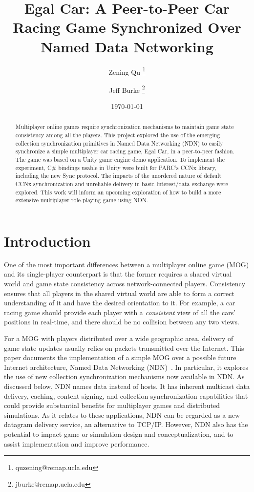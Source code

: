\documentclass{article}
\begin{document}
\title{Egal Car: A Peer-to-Peer Car Racing Game Synchronized Over Named Data Networking}
\author{Zening Qu \thanks{quzening@remap.ucla.edu}}
\author{Jeff Burke \thanks{jburke@remap.ucla.edu}}

\date{\today}
\maketitle

\begin{abstract}
Multiplayer online games require synchronization mechanisms to maintain game state consistency among all the players. This project explored the use of the emerging collection synchronization primitives in Named Data Networking (NDN) to easily synchronize a simple multiplayer car racing game, Egal Car, in a peer-to-peer fashion.  The game was based on a Unity game engine demo application. To implement the experiment, C\# bindings usable in Unity were built for PARC's CCNx library, including the new Sync protocol. The impacts of the unordered nature of default CCNx synchronization and unreliable delivery in basic Interest/data exchange were explored.  This work will inform an upcoming exploration of how to build a more extensive multiplayer role-playing game using NDN.  
\end{abstract}

\section{Introduction}
\label{introduction}

One of the most important differences between a multiplayer online game (MOG) and its single-player counterpart is that the former requires a shared virtual world and game state consistency across network-connected players. Consistency ensures that all players in the shared virtual world are able to form a correct understanding of it and have the desired orientation to it. For example, a car racing game should provide each player with a \emph{consistent} view of all the cars' positions in real-time, and there should be no collision between any two views. 

For a MOG with players distributed over a wide geographic area, delivery of game state updates usually relies on packets transmitted over the Internet.  This paper documents the implementation of a simple MOG over a possible future Internet architecture, Named Data Networking (NDN)~\cite{Jndn}. In particular, it explores the use of new collection synchronization mechanisms now available in NDN.  As discussed below, NDN names data instead of hosts. It has inherent multicast data delivery, caching, content signing, and collection synchronization capabilities that could provide substantial benefits for multiplayer games and distributed simulations. As it relates to these applications, NDN can be regarded as a new datagram delivery service, an alternative to TCP\slash IP. However, NDN also has the potential to impact game or simulation design and conceptualization, and to assist implementation and improve performance. 
\end{document}
